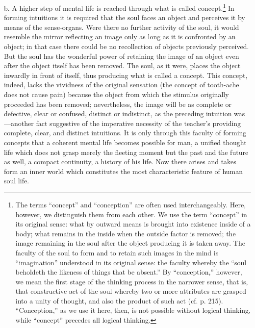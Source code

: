 b. A higher step of mental life is reached through what is called concept.\footnote{The terms “concept” and “conception” are often used interchangeably. Here, however, we distinguish them from each other. We use the term “concept” in its original sense: what by outward means is brought into existence inside of a body; what remains in the inside when the outside factor is removed; the image remaining in the soul after the object producing it is taken away. The faculty of the soul to form and to retain such images in the mind is “imagination” understood in its original sense: the faculty whereby the “soul beholdeth the likeness of things that be absent.” By “conception,” however, we mean the first stage of the thinking process in the narrower sense, that is, that constructive act of the soul whereby two or more attributes are grasped into a unity of thought, and also the product of such act (cf. p. 215). “Conception,” as we use it here, then, is not possible without logical thinking, while “concept” precedes all logical thinking.} In forming intuitions it is required that the soul faces an object and perceives it by means of the sense-organs. Were there no further activity of the soul, it would resemble the mirror reflecting an image only as long as it is confronted by an object; in that case there could be no recollection of objects previously perceived. But the soul has the wonderful power of retaining the image of an object even after the object itself has been removed. The soul, as it were, places the object inwardly in front of itself, thus producing what is called a concept. This concept, indeed, lacks the vividness of the original sensation (the
concept of tooth-ache does not cause pain) because the object from which the stimulus originally proceeded has been removed; nevertheless, the image will be as complete or defective, clear or confused, distinct or indistinct, as the preceding intuition was—another fact suggestive of the imperative necessity of the teacher’s providing complete, clear, and distinct intuitions. It is only through this faculty of forming concepts that a coherent mental life becomes possible for man, a unified thought life which does not grasp merely the fleeting moment but the past and the future as well, a compact continuity, a history of his life. Now there arises and takes form an inner world which constitutes the most characteristic feature of human soul life.

